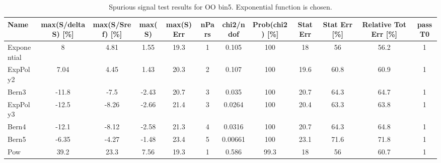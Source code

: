 \begin{landscape}
\begin{table}[]
\footnotesize
\begin{tabular}{l|ccccccccccc}
Name        & max(S/deltaS) {[}\%{]} & max(S/Sref) {[}\%{]} &  max(S) & max(S) Err & nPars & chi2/ndof & Prob(chi2) {[}\%{]} & Stat Err & Stat Err {[}\%{]} & Relative Tot Err {[}\%{]} & passT0 \\ \hline
Exponential & 8                      & 4.81                 &  1.55   & 19.3       & 1     & 0.105     & 100                 & 18       & 56                & 56.2                      & 1      \\
ExpPoly2    & 7.04                   & 4.45                 &  1.43   & 20.3       & 2     & 0.107     & 100                 & 19.6     & 60.8              & 60.9                      & 1      \\
Bern3       & -11.8                  & -7.5                 &  -2.43  & 20.7       & 3     & 0.035     & 100                 & 20.7     & 64.3              & 64.7                      & 1      \\
ExpPoly3    & -12.5                  & -8.26                &  -2.66  & 21.4       & 3     & 0.0264    & 100                 & 20.4     & 63.3              & 63.8                      & 1      \\
Bern4       & -12.1                  & -8.12                &  -2.58  & 21.3       & 4     & 0.0316    & 100                 & 20.7     & 64.3              & 64.8                      & 1      \\
Bern5       & -6.35                  & -4.27                &  -1.48  & 23.4       & 5     & 0.00661   & 100                 & 23.1     & 71.6              & 71.8                      & 1      \\
Pow         & 39.2                   & 23.3                 &  7.56   & 19.3       & 1     & 0.586     & 99.3                & 18       & 56                & 60.7                      & 1      \\
\end{tabular}
\caption{Spurious signal test results for OO bin5. Exponential function is chosen.}
\label{tab:SSbin5}
\end{table}


\end{landscape}
